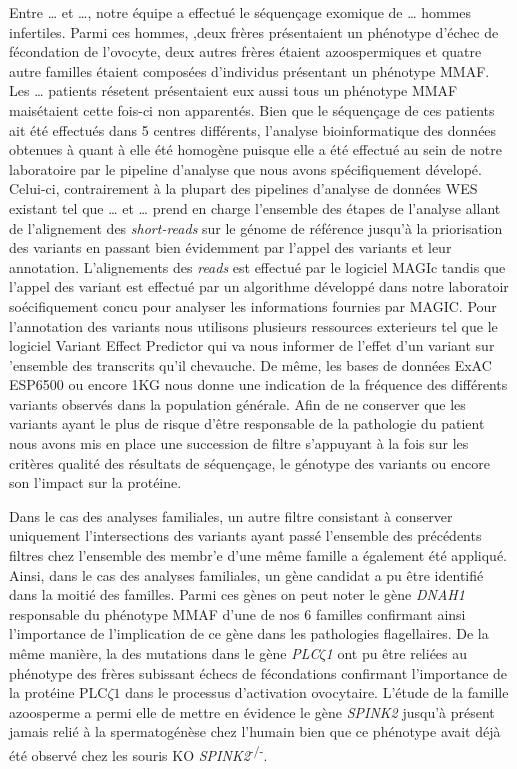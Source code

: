 \documentclass[12pt,twoside]{reedthesis}
\theoremstyle{definition}
\theoremstyle{definition}
\theoremstyle{remark}
\begin{document}
  Entre \ldots{} et \ldots{}, notre équipe a effectué le séquençage
  exomique de \ldots{} hommes infertiles. Parmi ces hommes, ,deux frères
  présentaient un phénotype d'échec de fécondation de l'ovocyte, deux
  autres frères étaient azoospermiques et quatre autre familles étaient
  composées d'individus présentant un phénotype MMAF. Les \ldots{}
  patients résetent présentaient eux aussi tous un phénotype MMAF
  maisétaient cette fois-ci non apparentés. Bien que le séquençage de ces
  patients ait été effectués dans 5 centres différents, l'analyse
  bioinformatique des données obtenues à quant à elle été homogène puisque
  elle a été effectué au sein de notre laboratoire par le pipeline
  d'analyse que nous avons spécifiquement dévelopé. Celui-ci,
  contrairement à la plupart des pipelines d'analyse de données WES
  existant tel que \ldots{} et \ldots{} prend en charge l'ensemble des
  étapes de l'analyse allant de l'alignement des \emph{short-reads} sur le
  génome de référence jusqu'à la priorisation des variants en passant bien
  évidemment par l'appel des variants et leur annotation. L'alignements
  des \emph{reads} est effectué par le logiciel MAGIc tandis que l'appel
  des variant est effectué par un algorithme développé dans notre
  laboratoir soécifiquement concu pour analyser les informations fournies
  par MAGIC. Pour l'annotation des variants nous utilisons plusieurs
  ressources exterieurs tel que le logiciel Variant Effect Predictor qui
  va nous informer de l'effet d'un variant sur 'ensemble des transcrits
  qu'il chevauche. De même, les bases de données ExAC ESP6500 ou encore
  1KG nous donne une indication de la fréquence des différents variants
  observés dans la population générale. Afin de ne conserver que les
  variants ayant le plus de risque d'être responsable de la pathologie du
  patient nous avons mis en place une succession de filtre s'appuyant à la
  fois sur les critères qualité des résultats de séquençage, le génotype
  des variants ou encore son l'impact sur la protéine.
  
  Dans le cas des analyses familiales, un autre filtre consistant à
  conserver uniquement l'intersections des variants ayant passé l'ensemble
  des précédents filtres chez l'ensemble des membr'e d'une même famille a
  également été appliqué. Ainsi, dans le cas des analyses familiales, un
  gène candidat a pu être identifié dans la moitié des familles. Parmi ces
  gènes on peut noter le gène \emph{DNAH1} responsable du phénotype MMAF
  d'une de nos 6 familles confirmant ainsi l'importance de l'implication
  de ce gène dans les pathologies flagellaires. De la même manière, la des
  mutations dans le gène \emph{PLC}\(\zeta\)\emph{1} ont pu être reliées
  au phénotype des frères subissant échecs de fécondations confirmant
  l'importance de la protéine PLC\(\zeta 1\) dans le processus
  d'activation ovocytaire. L'étude de la famille azoosperme a permi elle
  de mettre en évidence le gène \emph{SPINK2} jusqu'à présent jamais relié
  à la spermatogénèse chez l'humain bien que ce phénotype avait déjà été
  observé chez les souris KO \emph{SPINK2}\textsuperscript{-/-}.
  
\end{document}
